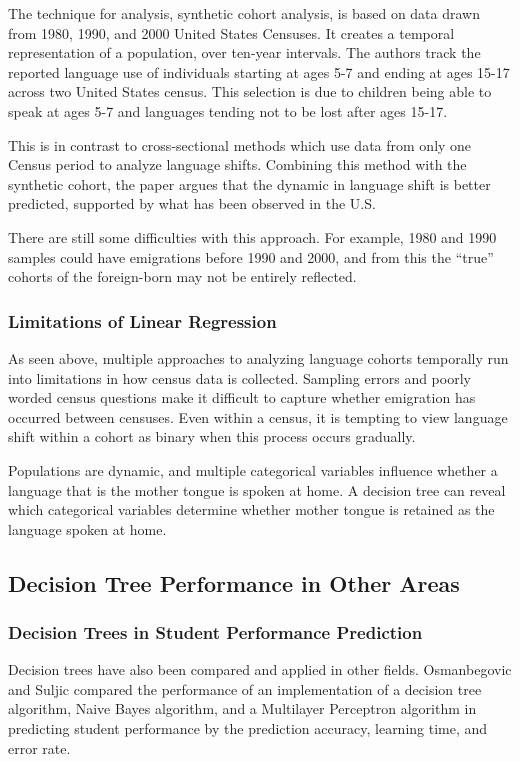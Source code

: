 \documentclass[10pt, conference, compsocconf]{IEEEtran}
\begin{document}
The technique for analysis, synthetic cohort analysis, is based on data drawn from 1980, 1990, and 2000 United States Censuses. It creates a temporal representation of a population, over ten-year intervals. The authors track the reported language use of individuals starting at ages 5-7 and ending at ages 15-17 across two United States census. This selection is due to children being able to speak at ages 5-7 and languages tending not to be lost after ages 15-17. \cite{spanish1}

This is in contrast to cross-sectional methods which use data from only one Census period to analyze language shifts. Combining this method with the synthetic cohort, the paper argues that the dynamic in language shift is better predicted, supported by what has been observed in the U.S. \cite{spanish1}

There are still some difficulties with this approach. For example, 1980 and 1990 samples could have emigrations before 1990 and 2000, and from this the “true” cohorts of the foreign-born may not be entirely reflected.\cite{spanish1}

\subsubsection{Limitations of Linear Regression}
As seen above, multiple approaches to analyzing language cohorts temporally run into limitations in how census data is collected. Sampling errors and poorly worded census questions make it difficult to capture whether emigration has occurred between censuses. Even within a census, it is tempting to view language shift within a cohort as binary when this process occurs gradually.

Populations are dynamic, and multiple categorical variables influence whether a language that is the mother tongue is spoken at home. A decision tree can reveal which categorical variables determine whether mother tongue is retained as the language spoken at home.

\subsection{Decision Tree Performance in Other Areas}
\subsubsection{Decision Trees in Student Performance Prediction}
Decision trees have also been compared and applied in other fields. Osmanbegovic and Suljic compared the performance of an implementation of a decision tree algorithm, Naive Bayes algorithm, and a Multilayer Perceptron algorithm in predicting student performance by the prediction accuracy, learning time, and error rate. \cite{performance1}
\end{document}
